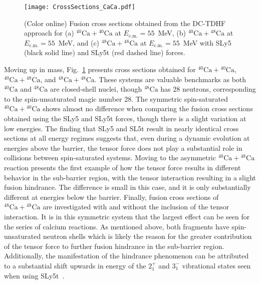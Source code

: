 \documentclass[aps,prc,twocolumn,showpacs,superscriptaddress,longbibliography,floatfix,10pt]{revtex4-1}
\begin{document}
\begin{figure}
	\texttt{[image: CrossSections\_CaCa.pdf]}
	\caption{(Color online) Fusion cross sections obtained from the DC-TDHF approach for (a) $^{40}\mathrm{Ca}+\mathrm{^{40}Ca}$ at $E_{\mathrm{c.m.}}=55$~MeV, (b) $^{40}\mathrm{Ca}+\mathrm{^{48}Ca}$ at $E_{\mathrm{c.m.}}=55$~MeV, and (c) $^{48}\mathrm{Ca}+\mathrm{^{48}Ca}$ at $E_{\mathrm{c.m.}}=55$~MeV with SLy5 (black solid line) and SLy5t (red dashed line) forces.
		\label{Fig:CaCaxsec}}
\end{figure}

Moving up in mass, Fig.~\ref{Fig:CaCaxsec} presents cross sections obtained for $^{40}\mathrm{Ca}+\mathrm{^{40}Ca}$, $^{40}\mathrm{Ca}+\mathrm{^{48}Ca}$, and $^{48}\mathrm{Ca}+\mathrm{^{48}Ca}$.
These systems are valuable benchmarks as both $^{40}\mathrm{Ca}$ and $\mathrm{^{48}Ca}$ are closed-shell nuclei, though $\mathrm{^{48}Ca}$ has $28$ neutrons, corresponding to the spin-unsaturated magic number 28.
The symmetric spin-saturated $^{40}\mathrm{Ca}+\mathrm{^{40}Ca}$ shows almost no difference when comparing the fusion cross sections obtained using the SLy5 and SLy5t forces, though there is a slight variation at low energies.
The finding that SLy5 and SL5t result in nearly identical cross sections at all energy regimes suggests that, even during a dynamic evolution at energies above the barrier, the tensor force does not play a substantial role in collisions between spin-saturated systems.
Moving to the asymmetric $^{40}\mathrm{Ca}+\mathrm{^{48}Ca}$ reaction presents the first example of how the tensor force results in different behavior in the sub-barrier region, with the tensor interaction resulting in a slight fusion hindrance.
The difference is small in this case, and it is only substantially different at energies below the barrier.
Finally, fusion cross sections of $^{48}\mathrm{Ca}+\mathrm{^{48}Ca}$ are investigated with and without the inclusion of the tensor interaction.
It is in this symmetric system that the largest effect can be seen for the series of calcium reactions.
As mentioned above, both fragments have spin-unsaturated neutron shells which is likely the reason for the greater contribution of the tensor force to further fusion hindrance in the sub-barrier region.
Additionally, the manifestation of the hindrance phenomenon can be attributed to a substantial shift upwards in energy of the $2^+_1$ and $3^-_1$ vibrational states seen when using SLy5t~\cite{guo2018}.
\end{document}
